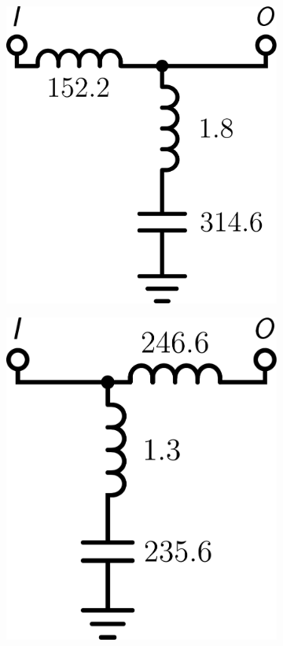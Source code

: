 \begin{figure}
\begin{subfigure}[t]{0.16\textwidth}
\includegraphics[scale = 0.14]{../ch6/figures/lpf1_circuit4}
\caption{\label{fig:lpf1_circuitc}}
\end{subfigure}%
\begin{subfigure}[t]{0.16\textwidth}
\centering
\includegraphics[scale = 0.14]{../ch6/figures/lpf1_circuit5}

\end{subfigure}
\end{figure}
